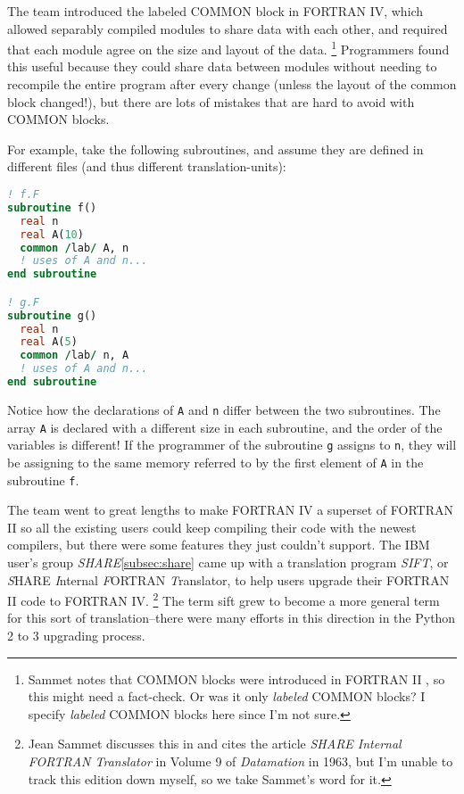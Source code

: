 The team introduced the labeled COMMON block in FORTRAN IV, which allowed
separably compiled modules to share data with each other,
and required that each module agree on the size and layout of the data.
\footnote{Sammet notes that COMMON blocks were introduced in FORTRAN II
	\cite[Section IV.3.1.]{sammet_programming_languages_history_and_fundamentals_1969},
	so this might need a fact-check. Or was it only \textit{labeled} COMMON blocks?
	I specify \textit{labeled} COMMON blocks here since I'm not sure.}
Programmers found this useful because they could share data between modules
without needing to recompile the entire program after every change
(unless the layout of the common block changed!),
but there are lots of mistakes that are hard to avoid with COMMON blocks.

For example, take the following subroutines, and assume they are
defined in different files (and thus different \gls{translation-unit}s):

\begin{lstlisting}[language=fortran,frame=single]
! f.F
subroutine f()
  real n
  real A(10)
  common /lab/ A, n
  ! uses of A and n...
end subroutine

! g.F
subroutine g()
  real n
  real A(5)
  common /lab/ n, A
  ! uses of A and n...
end subroutine
\end{lstlisting}

Notice how the declarations of \texttt{A} and \texttt{n} differ between the two
subroutines. The array \texttt{A} is declared with a different size in each subroutine,
and the order of the variables is different!
If the programmer of the subroutine \texttt{g} assigns to \texttt{n}, they
will be assigning to the same memory referred to by the first element of \texttt{A}
in the subroutine \texttt{f}.

The team went to great lengths to make FORTRAN IV a superset of FORTRAN II
so all the existing users could keep compiling their code with the newest
compilers, but there were some features they just couldn't support.
The IBM user's group \textit{SHARE}\cref{subsec:share} came up with a
translation program \textit{SIFT}, or
\textit{S}HARE \textit{I}nternal \textit{F}ORTRAN \textit{T}ranslator,
to help users upgrade their FORTRAN II code to FORTRAN IV.
\footnote{
	Jean Sammet discusses this in 
	and cites the article \textit{SHARE Internal FORTRAN Translator} in
	Volume 9 of \textit{Datamation} in 1963, but I'm unable to track this
	edition down myself, so we take Sammet's word for it.}
The term \gls{sift} grew to become a more general term for this sort of
translation--there were many efforts in this direction in the Python 2 to
3 upgrading process.

